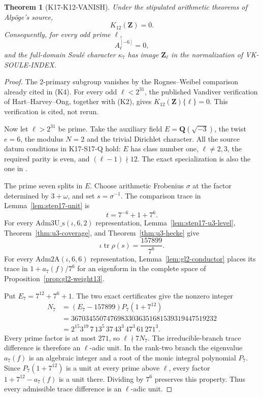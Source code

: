 \documentclass[11pt,a4paper]{article}
\newtheorem{theorem}{Theorem}[section]
\theoremstyle{definition}
\begin{document}
\begin{theorem}[K17-K12-VANISH]\label{thm:k12-vanish}
Under the stipulated arithmetic theorems of Alp\"oge's source,
\[
                         K_{12}(\mathbf Z)=0.
\]
Consequently, for every odd prime $\ell$,
\[
 A_\ell^{[-6]}=0,
\]
and the full-domain Soul\'e character $\kappa_7$ has image
$\mathbf Z_\ell$ in the normalization of VK-SOULE-INDEX.
\end{theorem}

\begin{proof}
The 2-primary subgroup vanishes by the Rognes--Weibel comparison already
cited in (K4). For every odd $\ell<2^{31}$, the published Vandiver
verification of Hart--Harvey--Ong, together with (K2), gives
$K_{12}(\mathbf Z)\{\ell\}=0$. This verification is cited, not rerun.

Now let $\ell>2^{31}$ be prime. Take the auxiliary field
$E=\mathbf Q(\sqrt{-3})$, the twist $e=6$, the modulus $N=2$ and the
trivial Dirichlet character. All the source datum conditions in K17-S17-Q
hold: $E$ has class number one, $\ell\ne2,3$, the required parity is even,
and $(\ell-1)\nmid12$. The exact specialization is also the one in
.

The prime seven splits in $E$. Choose arithmetic Frobenius $\sigma$
at the factor determined by $3+\omega$, and set $s=\sigma^{-1}$.
The comparison trace in Lemma~\ref{lem:step17-unit} is
\[
                t=7^{-6}+1+7^6.
\]
For every $\mathrm{Adm3U\_s}(\iota,6,2)$ representation,
Lemma~\ref{lem:step17-u3-level}, Theorem~\ref{thm:u3-coverage}, and
Theorem~\ref{thm:u3-hecke} give
\[
 \iota\operatorname{tr}\rho(s)=\frac{157899}{7^6}.
\]
For every $\mathrm{Adm2A}(\iota,6,6)$ representation,
Lemma~\ref{lem:gl2-conductor} places its trace in
$1+a_7(f)/7^6$ for an eigenform in the complete space of
Proposition~\ref{prop:gl2-weight13}.

Put $E_7=7^{12}+7^6+1$. The two exact certificates give the nonzero
integer
\begin{align*}
 N_7
 &=(E_7-157899)P_7(1+7^{12})\\
 &=36703455074769833036351681539319447519232\\
 &=2^{15}3^{19}\,7\,13^5\,37\,43^3\,47^3\,61\,271^3.
\end{align*}
Every prime factor is at most $271$, so $\ell\nmid7N_7$.
The irreducible-branch trace difference is therefore an $\ell$-adic
unit. In the rank-two branch the eigenvalue $a_7(f)$ is an algebraic
integer and a root of the monic integral polynomial $P_7$.
Since $P_7(1+7^{12})$ is a unit at every prime above $\ell$, every factor
$1+7^{12}-a_7(f)$ is a unit there. Dividing by $7^6$ preserves this
property. Thus every admissible trace difference is an $\ell$-adic unit.


\end{proof}
\end{document}
